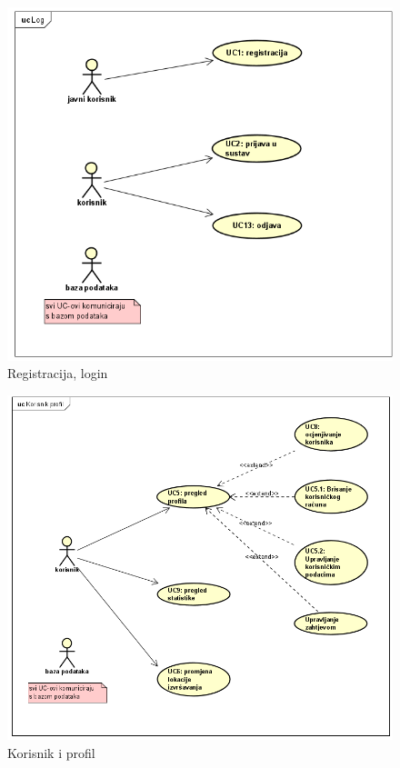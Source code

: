 					\begin{figure}[H]
					\includegraphics[scale=0.8]{slike/reg-log.png} %
					\centering
					\caption{Registracija, login}
				\end{figure}
				\newpage
				
					\begin{figure}[H]
					\includegraphics[scale=0.8]{slike/korisnik-profil.png} %
					\centering
					\caption{Korisnik i profil}
				\end{figure}
				\newpage
				
